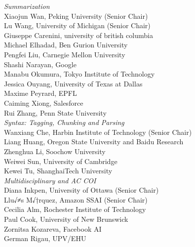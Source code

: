 \emph{Summarization} \\
\hspace*{0.2in} Xiaojun Wan, Peking University (Senior Chair)\\
\hspace*{0.2in} Lu Wang, University of Michigan (Senior Chair)\\
\hspace*{0.2in} Giuseppe Carenini, university of british columbia\\
\hspace*{0.2in} Michael Elhadad, Ben Gurion University\\
\hspace*{0.2in} Pengfei Liu, Carnegie Mellon University\\
\hspace*{0.2in} Shashi Narayan, Google\\
\hspace*{0.2in} Manabu Okumura, Tokyo Institute of Technology\\
\hspace*{0.2in} Jessica Ouyang, University of Texas at Dallas\\
\hspace*{0.2in} Maxime Peyrard, EPFL\\
\hspace*{0.2in} Caiming Xiong, Salesforce\\
\hspace*{0.2in} Rui Zhang, Penn State University\\

\emph{Syntax: Tagging, Chunking and Parsing} \\
\hspace*{0.2in} Wanxiang Che, Harbin Institute of Technology (Senior Chair)\\
\hspace*{0.2in} Liang Huang, Oregon State University and Baidu Research\\
\hspace*{0.2in} Zhenghua Li, Soochow University\\
\hspace*{0.2in} Weiwei Sun, University of Cambridge\\
\hspace*{0.2in} Kewei Tu, ShanghaiTech University\\

\emph{Multidisciplinary and AC COI} \\
\hspace*{0.2in} Diana Inkpen, University of Ottawa (Senior Chair)\\
\hspace*{0.2in} Llu√≠s M√†rquez, Amazon SSAI (Senior Chair)\\
\hspace*{0.2in} Cecilia Alm, Rochester Institute of Technology\\
\hspace*{0.2in} Paul Cook, University of New Brunswick\\
\hspace*{0.2in} Zornitsa Kozareva, Facebook AI\\
\hspace*{0.2in} German Rigau, UPV/EHU\\
